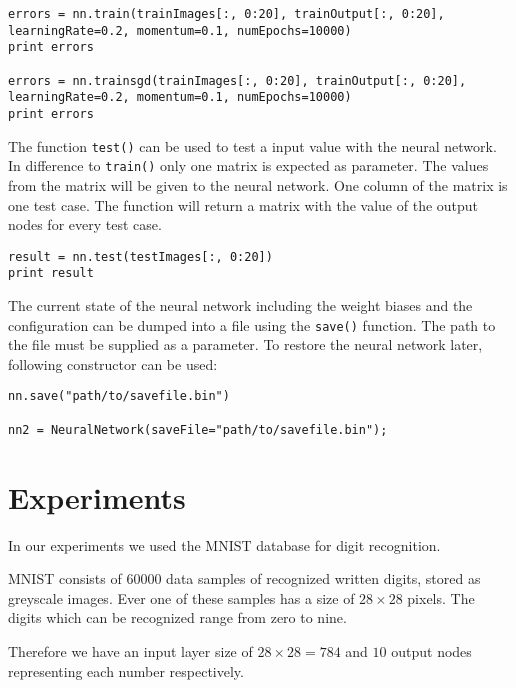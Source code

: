 \documentclass{acm_proc_article-sp}
\begin{document}
\lstset{language=Python}
\begin{lstlisting}[caption=Usage of trainsgd() and train()]
errors = nn.train(trainImages[:, 0:20], trainOutput[:, 0:20], learningRate=0.2, momentum=0.1, numEpochs=10000)
print errors

errors = nn.trainsgd(trainImages[:, 0:20], trainOutput[:, 0:20], learningRate=0.2, momentum=0.1, numEpochs=10000)
print errors
\end{lstlisting}


The function \texttt{test()} can be used to test a input value with the neural network. In difference to \texttt{train()} only one matrix is expected as parameter. The values from the matrix will be given to the neural network. One column of the matrix is one test case. The function will return a matrix with the value of the output nodes for every test case.

\lstset{language=Python}
\begin{lstlisting}[caption=Usage of test()]
result = nn.test(testImages[:, 0:20])
print result
\end{lstlisting}


The current state of the neural network including the weight biases and the configuration can be dumped into a file using the \texttt{save()} function. The path to the file must be supplied as a parameter. To restore the neural network later, following constructor can be used:
\lstset{language=Python}
\begin{lstlisting}[caption=Constructor to load a dump file]
nn.save("path/to/savefile.bin")

nn2 = NeuralNetwork(saveFile="path/to/savefile.bin");
\end{lstlisting}

\section{Experiments}

In our experiments we used the MNIST database for digit recognition.

MNIST consists of 60000 data samples of recognized written digits, stored as greyscale images.
Ever one of these samples has a size of $28 \times 28$ pixels. The digits which can be recognized range from zero to nine.

Therefore we have an input layer size of $28 \times 28= 784$ and $10$ output nodes representing each number respectively.
\end{document}
